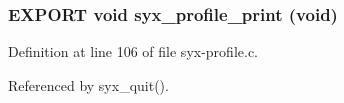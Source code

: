 \hypertarget{syx-profile_8h_5a29c7703551e87902d111cd247fbc21}{
\subsubsection{\setlength{\rightskip}{0pt plus 5cm}EXPORT void syx\_\-profile\_\-print (void)}}
\label{syx-profile_8h_5a29c7703551e87902d111cd247fbc21}




Definition at line 106 of file syx-profile.c.

Referenced by syx\_\-quit().